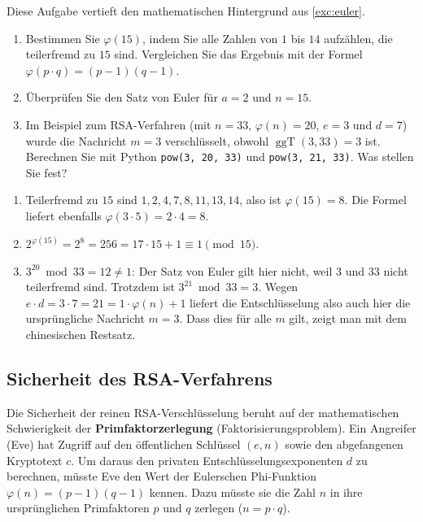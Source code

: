\begin{mychallenge}\label{mychallenge:euler}
	Diese Aufgabe vertieft den mathematischen Hintergrund aus \cref{exc:euler}.
	\begin{enumerate}
		\item Bestimmen Sie $\varphi(15)$, indem Sie alle Zahlen von $1$ bis $14$ aufzählen, die teilerfremd zu $15$ sind. Vergleichen Sie das Ergebnis mit der Formel $\varphi(p \cdot q) = (p-1)(q-1)$.
		\item Überprüfen Sie den Satz von Euler für $a = 2$ und $n = 15$.
		\item Im Beispiel zum \gls{RSA}-Verfahren (mit $n = 33$, $\varphi(n) = 20$, $e = 3$ und $d = 7$) wurde die Nachricht $m = 3$ verschlüsselt, obwohl $\operatorname{ggT}(3, 33) = 3$ ist. Berechnen Sie mit Python \lstinline|pow(3, 20, 33)| und \lstinline|pow(3, 21, 33)|. Was stellen Sie fest?
	\end{enumerate}
	\begin{myanswer}
		\begin{enumerate}
			\item Teilerfremd zu $15$ sind $1, 2, 4, 7, 8, 11, 13, 14$, also ist $\varphi(15) = 8$. Die Formel liefert ebenfalls $\varphi(3 \cdot 5) = 2 \cdot 4 = 8$.
			\item $2^{\varphi(15)} = 2^8 = 256 = 17 \cdot 15 + 1 \equiv 1 \pmod{15}$.
			\item $3^{20} \bmod 33 = 12 \neq 1$: Der Satz von Euler gilt hier nicht, weil $3$ und $33$ nicht teilerfremd sind. Trotzdem ist $3^{21} \bmod 33 = 3$. Wegen $e \cdot d = 3 \cdot 7 = 21 = 1 \cdot \varphi(n) + 1$ liefert die Entschlüsselung also auch hier die ursprüngliche Nachricht $m = 3$. Dass dies für alle $m$ gilt, zeigt man mit dem chinesischen Restsatz.
		\end{enumerate}
	\end{myanswer}
\end{mychallenge}

\subsection*{Sicherheit des \texorpdfstring{\acrshort{RSA}}{RSA}-Verfahrens}
Die Sicherheit der reinen \gls{RSA}-Verschlüsselung beruht auf der mathematischen Schwierigkeit der \textbf{Primfaktorzerlegung} (Faktorisierungsproblem). Ein Angreifer (Eve) hat Zugriff auf den öffentlichen Schlüssel $(e, n)$ sowie den abgefangenen Kryptotext $c$. Um daraus den privaten Entschlüsselungsexponenten $d$ zu berechnen, müsste Eve den Wert der Eulerschen Phi-Funktion $\varphi(n) = (p-1)(q-1)$ kennen. Dazu müsste sie die Zahl $n$ in ihre ursprünglichen Primfaktoren $p$ und $q$ zerlegen ($n = p \cdot q$).

